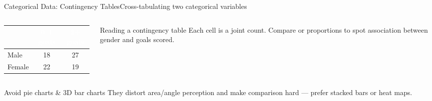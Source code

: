 \documentclass[aspectratio=169,11pt]{beamer}
\begin{document}
\begin{frame}{Categorical Data: Contingency Tables}{Cross-tabulating two categorical variables}
  \begin{columns}[T]
    \begin{column}{0.48\textwidth}
      \small
      \renewcommand{\arraystretch}{1.3}
      \begin{tabular}{@{}l cc@{}}
        \toprule
        \rowcolor{PrimaryDark}
        \textcolor{white}{} & \textcolor{white}{0--1 goals} & \textcolor{white}{2+ goals} \\
        \midrule
        Male & 18 & 27 \\
        \rowcolor{PrimaryLight!25}
        Female & 22 & 19 \\
        \bottomrule
      \end{tabular}
    \end{column}
    \begin{column}{0.52\textwidth}
      \begin{exampleblock}{Reading a contingency table}
        \small Each cell is a joint count. Compare  or
         proportions to spot association between gender and
        goals scored.
      \end{exampleblock}
    \end{column}
  \end{columns}
  \vfill
  \begin{alertblock}{Avoid pie charts \& 3D bar charts}
    \small They distort area/angle perception and make comparison hard —
    prefer stacked bars or heat maps.
  \end{alertblock}
\end{frame}
\end{document}
